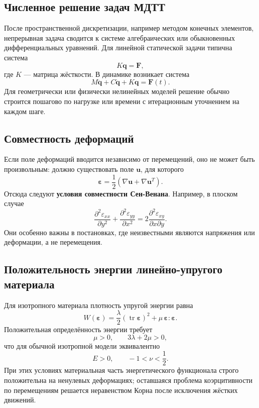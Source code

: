 \subsection{Численное решение задач МДТТ}

После пространственной дискретизации, например методом конечных элементов,
непрерывная задача сводится к системе алгебраических или обыкновенных
дифференциальных уравнений. Для линейной статической задачи типична система
\[
    K\mathbf q=\mathbf F,
\]
где $K$ --- матрица жёсткости. В динамике возникает система
\[
    M\ddot{\mathbf q}+C\dot{\mathbf q}+K\mathbf q=\mathbf F(t).
\]
Для геометрически или физически нелинейных моделей решение обычно строится
пошагово по нагрузке или времени с итерационным уточнением на каждом шаге.


\subsection{Совместность деформаций}

Если поле деформаций вводится независимо от перемещений, оно не может быть
произвольным: должно существовать поле $\mathbf u$, для которого
\[
    \boldsymbol\varepsilon
    =\frac12(\nabla\mathbf u+\nabla\mathbf u^T).
\]
Отсюда следуют \textbf{условия совместности Сен-Венана}. Например, в плоском
случае
\[
    \boxed{
    \frac{\partial^2\varepsilon_{xx}}{\partial y^2}
    +\frac{\partial^2\varepsilon_{yy}}{\partial x^2}
    =2\frac{\partial^2\varepsilon_{xy}}{\partial x\partial y}.
    }
\]
Они особенно важны в постановках, где неизвестными являются напряжения или
деформации, а не перемещения.

\subsection{Положительность энергии линейно-упругого материала}

Для изотропного материала плотность упругой энергии равна
\[
    W(\boldsymbol\varepsilon)
    =\frac{\lambda}{2}(\operatorname{tr}\boldsymbol\varepsilon)^2
     +\mu\,\boldsymbol\varepsilon:\boldsymbol\varepsilon.
\]
Положительная определённость энергии требует
\[
    \boxed{\mu>0,\qquad 3\lambda+2\mu>0,}
\]
что для обычной изотропной модели эквивалентно
\[
    E>0,\qquad -1<\nu<\frac12.
\]
При этих условиях материальная часть энергетического функционала строго
положительна на ненулевых деформациях; оставшаяся проблема коэрцитивности по
перемещениям решается неравенством Корна после исключения жёстких движений.

